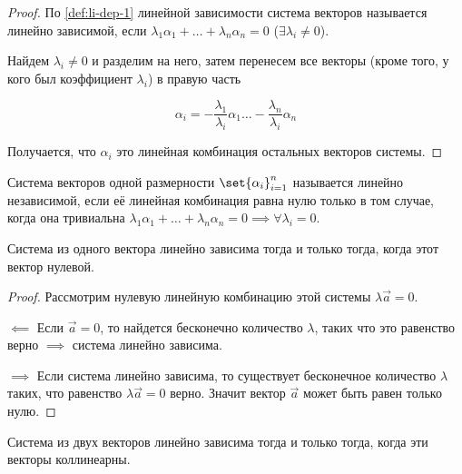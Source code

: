 \begin{proof}
  По \ref{def:li-dep-1} линейной зависимости система векторов называется линейно
  зависимой, если \(\lambda_1 \alpha_1 + \dotsc + \lambda_n \alpha_n = 0\)
  (\(\exists \lambda_i \ne 0\)).
  
  Найдем \(\lambda_i \ne 0\) и разделим на него, затем перенесем все векторы
  (кроме того, у кого был коэффициент \(\lambda_i\)) в правую часть
  
  \begin{equation*}
    \alpha_i
    = -\frac{\lambda_1}{\lambda_i} \alpha_1
      \dotsc
      -\frac{\lambda_n}{\lambda_i} \alpha_n
  \end{equation*}
  
  Получается, что \(\alpha_i\) это линейная комбинация остальных векторов
  системы.
\end{proof}

\begin{definition}
  Система векторов одной размерности \(\set{\alpha_i}_{i = 1}^n\) называется
  линейно независимой, если её линейная комбинация равна нулю только в том
  случае, когда она тривиальна \(\lambda_1 \alpha_1 + \dotsc + \lambda_n
  \alpha_n = 0 \implies \forall \lambda_i = 0\).
\end{definition}

\begin{theorem}
  Система из одного вектора линейно зависима тогда и только тогда, когда этот
  вектор нулевой.
\end{theorem}

\begin{proof}
  Рассмотрим нулевую линейную комбинацию этой системы \(\lambda \vec{a} = 0\).
  
  \(\impliedby\) Если \(\vec{a} = 0\), то найдется бесконечно количество
  \(\lambda\), таких что это равенство верно \(\implies\) система линейно
  зависима.
  
  \(\implies\) Если система линейно зависима, то существует бесконечное
  количество \(\lambda\) таких, что равенство \(\lambda \vec{a} = 0\) верно.
  Значит вектор \(\vec{a}\) может быть равен только нулю.
\end{proof}

\begin{theorem}
  Система из двух векторов линейно зависима тогда и только тогда, когда эти
  векторы коллинеарны.
\end{theorem}

